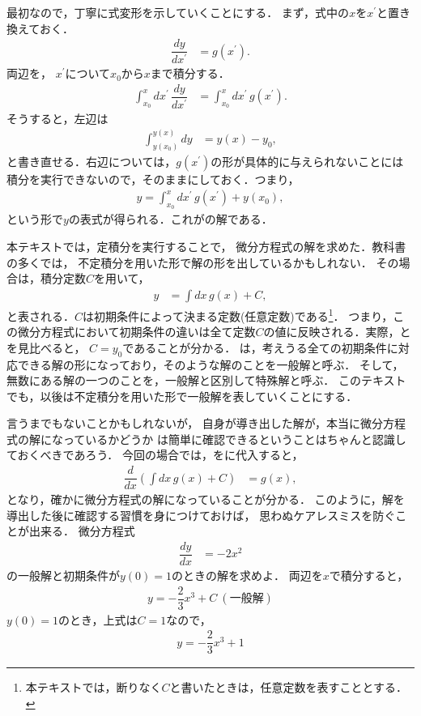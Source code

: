 最初なので，丁寧に式変形を示していくことにする．
まず，式中の$x$を$x^\prime$と置き換えておく．
%
\begin{align}
 \dfrac{dy}{dx^{\prime}} & =g\left(x^{\prime}\right).
\end{align}
%
両辺を，
$x^{\prime}$について$x_0$から$x$まで積分する．
\begin{align}
 \int_{x_{0}}^{x}dx^{\prime}\,\dfrac{dy}{dx^{\prime}} & =\int_{x_{0}}^{x}dx^{\prime}\,g\left(x^{\prime}\right). \label{eq:PDE_01_teiseki}
\end{align}
そうすると，左辺は
\begin{align}
 \int_{y\left(x_{0}\right)}^{y\left(x\right)}dy & =y\left(x\right)-y_{0},
\end{align}
と書き直せる．右辺については，$g(x^\prime)$の形が具体的に与えられないことには
積分を実行できないので，そのままにしておく．つまり，
\begin{align}
 y = \int_{x_0}^{x} dx^\prime \, g(x^\prime) + y\left(x_0\right), \label{eq:PDE_01_sol_01}
\end{align}
という形で$y$の表式が得られる．これがの解である．

本テキストでは，定積分を実行することで，
微分方程式の解を求めた．教科書の多くでは，
不定積分を用いた形で解の形を出しているかもしれない．
その場合は，積分定数$C$を用いて，
\begin{align}
y & =\int dx\, g\left(x\right)+C, \label{eq:PDE_01_sol_02}
\end{align}
と表される．$C$は初期条件によって決まる定数(任意定数)である\footnote{本テキストでは，断りなく$C$と書いたときは，任意定数を表すこととする．}．
つまり，この微分方程式において初期条件の違いは全て定数$C$の値に反映される．実際，とを見比べると，
$C=y_0$であることが分かる．
は，考えうる全ての初期条件に対応できる解の形になっており，そのような解のことを一般解と呼ぶ．
そして，無数にある解の一つのことを，一般解と区別して特殊解と呼ぶ．
このテキストでも，以後は不定積分を用いた形で一般解を表していくことにする．

言うまでもないことかもしれないが，
自身が導き出した解が，本当に微分方程式の解になっているかどうか
は簡単に確認できるということはちゃんと認識しておくべきであろう．
今回の場合では，をに代入すると，
\begin{align}
  \dfrac{d}{dx}\left(\int dx\,g\left(x\right)+C\right) & =g\left(x\right),
\end{align}
となり，確かに微分方程式の解になっていることが分かる．
このように，解を導出した後に確認する習慣を身につけておけば，
思わぬケアレスミスを防ぐことが出来る．
%
\newpage
\gl
\reidai
微分方程式
\begin{align}
 \dfrac{dy}{dx} & =-2x^{2}
\end{align}
の一般解と初期条件が$y(0)=1$のときの解を求めよ．
\gl
両辺を$x$で積分すると，
\begin{align}
 y = -\dfrac{2}{3}x^3 + C~(一般解) 
\end{align}
$y(0)=1$のとき，上式は$C=1$なので，
\begin{align}
  y = -\dfrac{2}{3}x^3 + 1 
\end{align}
%
\newpage
%
